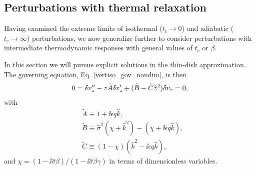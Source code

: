 
\subsection{Perturbations with thermal relaxation}\label{analytic_relax}
Having examined the extreme limits of isothermal ($t_c\to0$) and
adiabatic ($t_c\to\infty$) perturbations, we now generalize further to consider
perturbations with intermediate thermodynamic responses with general
values of $t_c$ or $\beta$.  

In this section we will pursue explicit solutions in the thin-disk
approximation. The governing equation, Eq. \ref{vertiso_gov_nondim}, is
then 
\begin{align}
  0 = \delta v_z^{\prime\prime} - z \widetilde{A}\delta v_z^\prime +
  (\widetilde{B} - \widetilde{C}\hat{z}^2)\delta v_z = 0,\label{nearly_iso_explicit}
\end{align}
with
\begin{align}
  &\widetilde{A} \equiv 1 + \ii \epsilon q \hat{k},\\
  &\widetilde{B} \equiv \hat{\sigma}^2\left(\chi + \hat{k}^2\right) -
  \left(\chi + \ii \epsilon q \hat{k}\right),\\
  &\widetilde{C} \equiv \left(1-\chi\right)\left(\hat{k}^2 - \ii
      \epsilon q\hat{k}\right), 
\end{align}
and $\chi =
\left(1-\ii\hat{\sigma}\beta\right)/\left(1-\ii\hat{\sigma}\beta\gamma\right)
$ in terms of dimensionless variables.  


